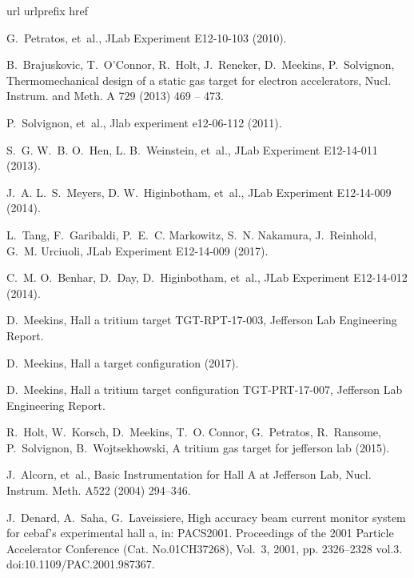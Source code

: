 \documentclass[final,5p,times,twocolumn]{elsarticle}
\begin{document}
\begin{thebibliography}{10}
\expandafter\ifx\csname url\endcsname\relax
  \def\url#1{\texttt{#1}}\fi
\expandafter\ifx\csname urlprefix\endcsname\relax\def\urlprefix{URL }\fi
\expandafter\ifx\csname href\endcsname\relax
  \def\href#1#2{#2} \def\path#1{#1}\fi

G.~Petratos, et~al., {JLab Experiment E12-10-103} (2010).

B.~Brajuskovic, T.~O'Connor, R.~Holt, J.~Reneker, D.~Meekins, P.~Solvignon,
  Thermomechanical design of a static gas target for electron accelerators,
  Nucl. Instrum. and Meth. A 729 (2013) 469 -- 473.

P.~Solvignon, et~al., Jlab experiment e12-06-112 (2011).

S.~G. W.~B. O.~Hen, L. B.~Weinstein, et~al., {JLab Experiment E12-14-011}
  (2013).

J.~A. L.~S.~Meyers, D. W.~Higinbotham, et~al., {JLab Experiment E12-14-009}
  (2014).

L.~Tang, F.~Garibaldi, P.~E.~C. Markowitz, S.~N. Nakamura, J.~Reinhold, G.~M.
  Urciuoli, {JLab Experiment E12-14-009} (2017).

C.~M. O.~Benhar, D.~Day, D.~Higinbotham, et~al., {JLab Experiment E12-14-012}
  (2014).

D.~Meekins, Hall a tritium target {TGT-RPT-17-003}, Jefferson Lab Engineering
  Report.

D.~Meekins, Hall a target configuration (2017).

D.~Meekins, Hall a tritium target configuration {TGT-PRT-17-007}, Jefferson Lab
  Engineering Report.

R.~Holt, W.~Korsch, D.~Meekins, T.~O. Connor, G.~Petratos, R.~Ransome,
  P.~Solvignon, B.~Wojtsekhowski, A tritium gas target for jefferson lab
  (2015).

J.~Alcorn, et~al., {Basic Instrumentation for Hall A at Jefferson Lab}, Nucl.
  Instrum. Meth. A522 (2004) 294--346.

J.~Denard, A.~Saha, G.~Laveissiere, High accuracy beam current monitor system
  for cebaf's experimental hall a, in: PACS2001. Proceedings of the 2001
  Particle Accelerator Conference (Cat. No.01CH37268), Vol.~3, 2001, pp.
  2326--2328 vol.3.
\newblock \href {http://dx.doi.org/10.1109/PAC.2001.987367}
  {\path{doi:10.1109/PAC.2001.987367}}.

\end{thebibliography}
\end{document}
